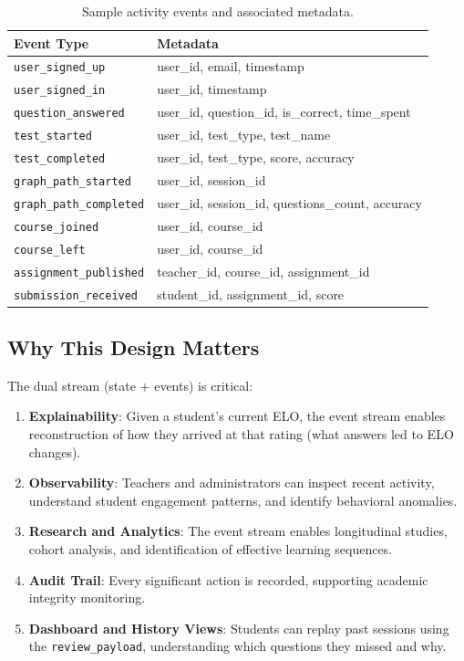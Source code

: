 \documentclass[sigconf,authordraft,twoside]{acmart}
\newcommand{\tech}[1]{\textcolor{brandblue}{\nolinkurl{#1}}}
\begin{document}
\begin{table}[t]
\centering
\small
\begin{tabularx}{\columnwidth}{>{\raggedright\arraybackslash}p{} X}
\toprule
\textbf{Event Type} & \textbf{Metadata} \\
\midrule
\tech{user\_signed\_up} & user\_id, email, timestamp \\
\tech{user\_signed\_in} & user\_id, timestamp \\
\tech{question\_answered} & user\_id, question\_id, is\_correct, time\_spent \\
\tech{test\_started} & user\_id, test\_type, test\_name \\
\tech{test\_completed} & user\_id, test\_type, score, accuracy \\
\tech{graph\_path\_started} & user\_id, session\_id \\
\tech{graph\_path\_completed} & user\_id, session\_id, questions\_count, accuracy \\
\tech{course\_joined} & user\_id, course\_id \\
\tech{course\_left} & user\_id, course\_id \\
\tech{assignment\_published} & teacher\_id, course\_id, assignment\_id \\
\tech{submission\_received} & student\_id, assignment\_id, score \\
\bottomrule
\end{tabularx}
\caption{Sample activity events and associated metadata.}
\end{table}

\subsection{Why This Design Matters}

The dual stream (state + events) is critical:

\begin{enumerate}
\item \textbf{Explainability}: Given a student's current ELO, the event stream enables reconstruction of how they arrived at that rating (what answers led to ELO changes).

\item \textbf{Observability}: Teachers and administrators can inspect recent activity, understand student engagement patterns, and identify behavioral anomalies.

\item \textbf{Research and Analytics}: The event stream enables longitudinal studies, cohort analysis, and identification of effective learning sequences.

\item \textbf{Audit Trail}: Every significant action is recorded, supporting academic integrity monitoring.

\item \textbf{Dashboard and History Views}: Students can replay past sessions using the \tech{review\_payload}, understanding which questions they missed and why.
\end{enumerate}
\end{document}
